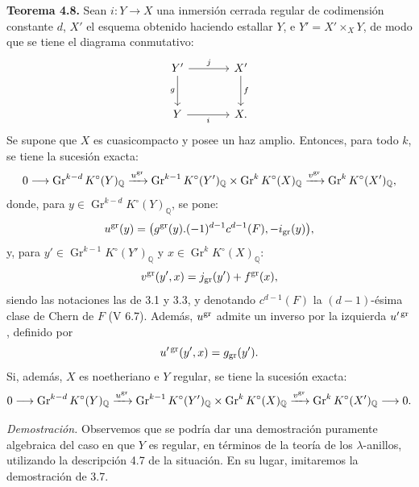\providecommand{\sisi}[2]{#2}

\textbf{Teorema 4.8.} Sean \(i:Y\to X\) una inmersión cerrada regular de codimensión constante \(d\), \(X'\) el esquema obtenido haciendo estallar \(Y\), e \(Y'=X'\times_XY\), de modo que se tiene el diagrama conmutativo:
\[
\begin{tikzcd}[column sep=large,row sep=large]
Y' \arrow[r,"j"] \arrow[d,"g"'] & X' \arrow[d,"f"]\\
Y \arrow[r,"i"'] & X.
\end{tikzcd}
\]
Se supone que \(X\) es cuasicompacto y posee un haz amplio. Entonces, para todo \(k\), se tiene la sucesión exacta:
\[
0\longrightarrow
\operatorname{Gr}^{k-d}K^\circ(Y)_{\mathbb Q}
\xrightarrow{u^{\operatorname{gr}}}
\operatorname{Gr}^{k-1}K^\circ(Y')_{\mathbb Q}
\times
\operatorname{Gr}^{k}K^\circ(X)_{\mathbb Q}
\xrightarrow{v^{\operatorname{gr}}}
\operatorname{Gr}^{k}K^\circ(X')_{\mathbb Q},
\]
donde, para \(y\in \operatorname{Gr}^{k-d}K^\circ(Y)_{\mathbb Q}\), se pone:
\[
  u^{\operatorname{gr}}(y)=
  \bigl(g^{\operatorname{gr}}(y).(-1)^{d-1}c^{d-1}(F),-i_{\operatorname{gr}}(y)\bigr),
\]
y, para \(y'\in \operatorname{Gr}^{k-1}K^\circ(Y')_{\mathbb Q}\) y \(x\in \operatorname{Gr}^{k}K^\circ(X)_{\mathbb Q}\):
\[
  v^{\operatorname{gr}}(y',x)=j_{\operatorname{gr}}(y')+f^{\operatorname{gr}}(x),
\]
siendo las notaciones las de 3.1 y 3.3, y denotando \(c^{d-1}(F)\) la \((d-1)\)-ésima clase de Chern de \(F\) (V 6.7). Además, \(u^{\operatorname{gr}}\) admite un inverso por la izquierda \(u'^{\operatorname{gr}}\), definido por
\[
  u'^{\operatorname{gr}}(y',x)=g_{\operatorname{gr}}(y').
\]
Si, además, \(X\) es noetheriano e \(Y\) regular, se tiene la sucesión exacta:
\[
0\longrightarrow
\operatorname{Gr}^{k-d}K^\circ(Y)_{\mathbb Q}
\xrightarrow{u^{\operatorname{gr}}}
\operatorname{Gr}^{k-1}K^\circ(Y')_{\mathbb Q}
\times
\operatorname{Gr}^{k}K^\circ(X)_{\mathbb Q}
\xrightarrow{v^{\operatorname{gr}}}
\operatorname{Gr}^{k}K^\circ(X')_{\mathbb Q}
\longrightarrow0.
\]

\emph{Demostración.} Observemos que se podría dar una demostración puramente algebraica del caso en que \(Y\) es regular, en términos de la teoría de los \(\lambda\)-anillos, utilizando la descripción 4.7 de la situación. En su lugar, imitaremos la demostración de 3.7.

